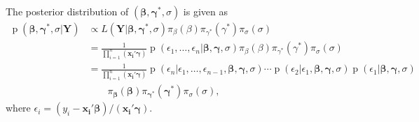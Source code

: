 \documentclass[12pt]{article}
\DeclareMathOperator{\pr}{p}
\begin{document}
The posterior distribution of $(\bm{\beta}, \bm{\gamma^{*}}, \sigma)$ is given as
\begin{equation}\label{ch2:eq:post}
  \begin{aligned}
    \pr(\bm{\beta}, \bm{\gamma^{*}}, \sigma|\bm{Y}) & \propto L(\bm{Y}| \bm{\beta}, \bm{\gamma^{*}}, \sigma)
\pi_{\beta}(\beta) \pi_{\gamma^{*}}(\gamma^{*}) \pi_{\sigma}(\sigma) \\
    & = \frac{1}{\prod_{i=1}^n (\bm{x_i'\gamma})} \pr \left(\epsilon_1, \ldots, \epsilon_n | \bm{\beta}, \bm{\gamma}, \sigma\right)
 \pi_{\beta}(\beta) \pi_{\gamma^{*}}(\gamma^{*}) \pi_{\sigma}(\sigma) \\
    & = \frac{1}{\prod_{i=1}^n (\bm{x_i'\gamma})} \pr \left(\epsilon_n| \epsilon_1, \ldots, \epsilon_{n-1}, \bm{\beta}, \bm{\gamma}, \sigma\right) \cdots \pr \left(\epsilon_2| \epsilon_1, \bm{\beta}, \bm{\gamma}, \sigma\right)
\pr \left(\epsilon_1| \bm{\beta}, \bm{\gamma}, \sigma\right)\\
    & \qquad \pi_{\bm{\beta}}(\bm{\beta}) \pi_{\bm{\gamma}^{*}}(\bm{\gamma}^{*}) \pi_{\sigma}(\sigma),
  \end{aligned}
\end{equation}
where $\epsilon_i = (y_i - \bm{x_i'\beta})/(\bm{x_i'\gamma})$.
\end{document}
